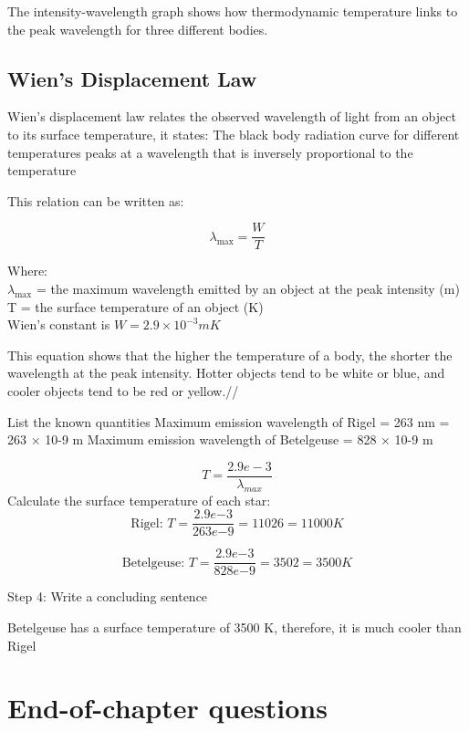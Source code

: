 The intensity-wavelength graph shows how thermodynamic temperature links to the peak wavelength for three different bodies.

\subsection {Wien's Displacement Law}
Wien’s displacement law relates the observed wavelength of light from an object to its surface temperature, it states:
The black body radiation curve for different temperatures peaks at a wavelength that is inversely proportional to the temperature

This relation can be written as:

\begin{equation*}
    \lambda_{\mathrm{max}}=\frac{W}{T}
\end{equation*}

Where:\\
$\lambda_{\mathrm{max}}$ = the maximum wavelength emitted by an object at the peak intensity (m) \\
T = the surface temperature of an object (K) \\
Wien's constant is $W=2.9\times 10^{-3} mK $

This equation shows that the higher the temperature of a body, the shorter the wavelength at the peak intensity. Hotter objects tend to be white or blue, and cooler objects tend to be red or yellow.//


\begin{soln}
List the known quantities
Maximum emission wavelength of Rigel = 263 nm = 263 × 10-9 m
Maximum emission wavelength of Betelgeuse = 828 × 10-9 m

$$T = \frac{2.9e-3}{\lambda_{max}}$$
Calculate the surface temperature of each star:
$$\text{Rigel: }T=\frac{2.9e{-3}}{263e{-9}}=11026 = 11 000K$$

$$\text{Betelgeuse: }T=\frac{2.9e{-3}}{828e{-9}}=3502 = 3500K$$

Step 4: Write a concluding sentence

Betelgeuse has a surface temperature of 3500 K, therefore, it is much cooler than Rigel
\end{soln}


\section{End-of-chapter questions}

